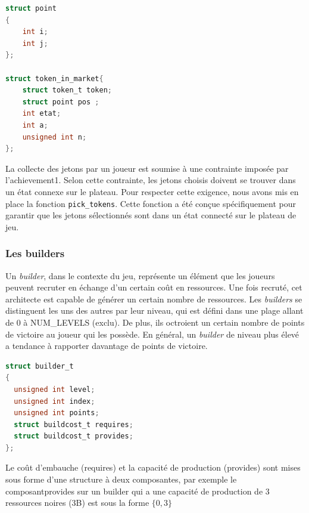 \documentclass{article}
\begin{document}
\begin{tcolorbox}[colback=gray!10,colframe=white!75!black]

\begin{lstlisting}[language=C, caption={la structure token\_in\_market}, label={lst:exemple7-c}]
struct point
{
    int i;
    int j;
};

struct token_in_market{
    struct token_t token;
    struct point pos ;
    int etat;                            
    int a;                        
    unsigned int n;             
};
\end{lstlisting}
\end{tcolorbox}
\vspace{2em}
\hspace{1.5em}La collecte des jetons par un joueur est soumise à une contrainte imposée par l'achievement1. Selon cette contrainte, les jetons choisis doivent se trouver dans un état connexe sur le plateau. Pour respecter cette exigence, nous avons mis en place la fonction \texttt{pick\_tokens}. Cette fonction a été conçue spécifiquement pour garantir que les jetons sélectionnés sont dans un état connecté sur le plateau de jeu.



\subsubsection{Les builders}



    Un \emph{builder}, dans le contexte du jeu, représente un élément que les joueurs peuvent recruter en échange d'un certain coût en ressources. Une fois recruté, cet architecte est capable de générer un certain nombre de ressources. Les \emph{builders} se distinguent les uns des autres par leur niveau, qui est défini dans une plage allant de 0 à NUM\_LEVELS (exclu). De plus, ils octroient un certain nombre de points de victoire au joueur qui les possède. En général, un \emph{builder} de niveau plus élevé a tendance à rapporter davantage de points de victoire.

    
   
\begin{tcolorbox}[colback=gray!10,colframe=white!75!black]

\begin{lstlisting}[language=C, caption={La structure caracterisant un Builder}, 
label={lst:exemple2-c}]
struct builder_t
{
  unsigned int level;
  unsigned int index;
  unsigned int points;
  struct buildcost_t requires;
  struct buildcost_t provides;
};
\end{lstlisting}
\end{tcolorbox}
\vspace{10pt}
Le  coût d'embauche (requires) et la  capacité de production (provides) sont mises sous forme d'une structure à deux composantes,
par exemple le composantprovides  sur un builder qui a une capacité de production de 3 ressources noires (3B)  est sous la forme \(\{0,3\}\)
    
\end{document}
